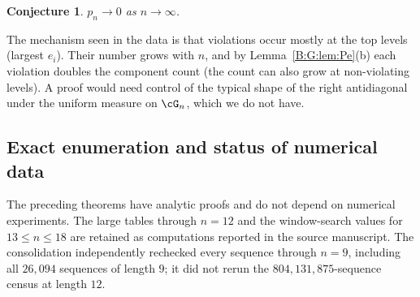 \documentclass[11pt,a4paper]{article}
\newtheorem{conjecture}[theorem]{Conjecture}
\theoremstyle{definition}
\theoremstyle{remark}
\numberwithin{equation}{section}
\begin{document}
\begin{conjecture}\label{B:G:conj:pn}
$p_n\to0$ as $n\to\infty$.
\end{conjecture}

The mechanism seen in the data is that violations occur mostly at the top levels (largest
$e_i$). Their number grows with $n$, and by Lemma~\ref{B:G:lem:Pe}(b) each violation doubles the
component count (the count can also grow at non-violating levels). A proof would need control of the typical shape of the right antidiagonal under
the uniform measure on $\cG_n$, which we do not have.

\subsection{Exact enumeration and status of numerical data}\label{B:G:sub:comp-data}
The preceding theorems have analytic proofs and do not depend on numerical
experiments. The large tables through $n=12$ and the window-search values
for $13\le n\le18$ are retained as computations reported in the source
manuscript. The consolidation independently rechecked every sequence through
$n=9$, including all $26{,}094$ sequences of length $9$; it did not rerun the
$804{,}131{,}875$-sequence census at length $12$.
\end{document}
